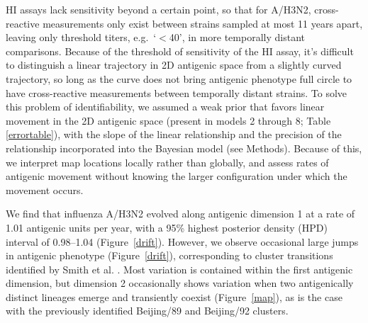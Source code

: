 \documentclass[11pt,oneside,letterpaper]{article}
\begin{document}
HI assays lack sensitivity beyond a certain point, so that for A/H3N2, cross-reactive measurements only exist between strains sampled at most 11 years apart, leaving only threshold titers, e.g.\ `$<$40', in more temporally distant comparisons.  
Because of the threshold of sensitivity of the HI assay, it's difficult to distinguish a linear trajectory in 2D antigenic space from a slightly curved trajectory, so long as the curve does not bring antigenic phenotype full circle to have cross-reactive measurements between temporally distant strains.
To solve this problem of identifiability, we assumed a weak prior that favors linear movement in the 2D antigenic space (present in models 2 through 8; Table \ref{errortable}), with the slope of the linear relationship and the precision of the relationship incorporated into the Bayesian model (see Methods).
Because of this, we interpret map locations locally rather than globally, and assess rates of antigenic movement without knowing the larger configuration under which the movement occurs.
 
We find that influenza A/H3N2 evolved along antigenic dimension 1 at a rate of 1.01 antigenic units per year, with a 95\% highest posterior density (HPD) interval of 0.98--1.04 (Figure~\ref{drift}).
However, we observe occasional large jumps in antigenic phenotype (Figure~\ref{drift}), corresponding to cluster transitions identified by Smith et al. \cite{Smith04}.  
Most variation is contained within the first antigenic dimension, but dimension 2 occasionally shows variation when two antigenically distinct lineages emerge and transiently coexist (Figure~\ref{map}), as is the case with the previously identified Beijing/89 and Beijing/92 clusters.
\end{document}
